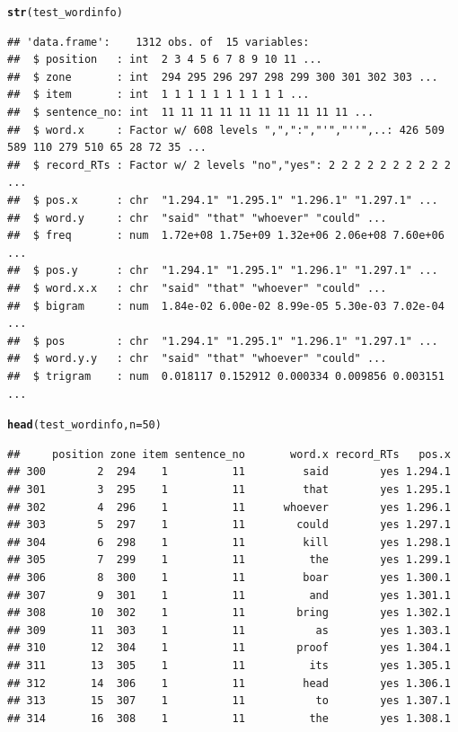 \documentclass{article}\usepackage[]{graphicx}\usepackage[]{color}
\makeatletter
\newcommand{\hlnum}[1]{\textcolor[rgb]{0.686,0.059,0.569}{#1}}%
\newcommand{\hlstd}[1]{\textcolor[rgb]{0.345,0.345,0.345}{#1}}%
\newcommand{\hlkwc}[1]{\textcolor[rgb]{0.333,0.667,0.333}{#1}}%
\newcommand{\hlkwd}[1]{\textcolor[rgb]{0.737,0.353,0.396}{\textbf{#1}}}%
\newenvironment{kframe}{%
 \def\at@end@of@kframe{}%
 \ifinner\ifhmode%
  \def\at@end@of@kframe{\end{minipage}}%
  \begin{minipage}{\columnwidth}%
 \fi\fi%
 \def\FrameCommand##1{\hskip\@totalleftmargin \hskip-\fboxsep
 \colorbox{shadecolor}{##1}\hskip-\fboxsep
     \hskip-\linewidth \hskip-\@totalleftmargin \hskip\columnwidth}%
 \MakeFramed {\advance\hsize-\width
   \@totalleftmargin\z@ \linewidth\hsize
   \@setminipage}}%
 {\par\unskip\endMakeFramed%
 \at@end@of@kframe}
\newenvironment{knitrout}{}{} %
\makeatother
\begin{document}
\begin{knitrout}
\begin{kframe}
\begin{alltt}
\hlkwd{str}\hlstd{(test_wordinfo)}
\end{alltt}
\begin{verbatim}
## 'data.frame':	1312 obs. of  15 variables:
##  $ position   : int  2 3 4 5 6 7 8 9 10 11 ...
##  $ zone       : int  294 295 296 297 298 299 300 301 302 303 ...
##  $ item       : int  1 1 1 1 1 1 1 1 1 1 ...
##  $ sentence_no: int  11 11 11 11 11 11 11 11 11 11 ...
##  $ word.x     : Factor w/ 608 levels ",",":","'","''",..: 426 509 589 110 279 510 65 28 72 35 ...
##  $ record_RTs : Factor w/ 2 levels "no","yes": 2 2 2 2 2 2 2 2 2 2 ...
##  $ pos.x      : chr  "1.294.1" "1.295.1" "1.296.1" "1.297.1" ...
##  $ word.y     : chr  "said" "that" "whoever" "could" ...
##  $ freq       : num  1.72e+08 1.75e+09 1.32e+06 2.06e+08 7.60e+06 ...
##  $ pos.y      : chr  "1.294.1" "1.295.1" "1.296.1" "1.297.1" ...
##  $ word.x.x   : chr  "said" "that" "whoever" "could" ...
##  $ bigram     : num  1.84e-02 6.00e-02 8.99e-05 5.30e-03 7.02e-04 ...
##  $ pos        : chr  "1.294.1" "1.295.1" "1.296.1" "1.297.1" ...
##  $ word.y.y   : chr  "said" "that" "whoever" "could" ...
##  $ trigram    : num  0.018117 0.152912 0.000334 0.009856 0.003151 ...
\end{verbatim}
\begin{alltt}
\hlkwd{head}\hlstd{(test_wordinfo,} \hlkwc{n} \hlstd{=} \hlnum{50}\hlstd{)}
\end{alltt}
\begin{verbatim}
##     position zone item sentence_no       word.x record_RTs   pos.x
## 300        2  294    1          11         said        yes 1.294.1
## 301        3  295    1          11         that        yes 1.295.1
## 302        4  296    1          11      whoever        yes 1.296.1
## 303        5  297    1          11        could        yes 1.297.1
## 304        6  298    1          11         kill        yes 1.298.1
## 305        7  299    1          11          the        yes 1.299.1
## 306        8  300    1          11         boar        yes 1.300.1
## 307        9  301    1          11          and        yes 1.301.1
## 308       10  302    1          11        bring        yes 1.302.1
## 309       11  303    1          11           as        yes 1.303.1
## 310       12  304    1          11        proof        yes 1.304.1
## 311       13  305    1          11          its        yes 1.305.1
## 312       14  306    1          11         head        yes 1.306.1
## 313       15  307    1          11           to        yes 1.307.1
## 314       16  308    1          11          the        yes 1.308.1

\end{verbatim}
\end{kframe}
\end{knitrout}
\end{document}
